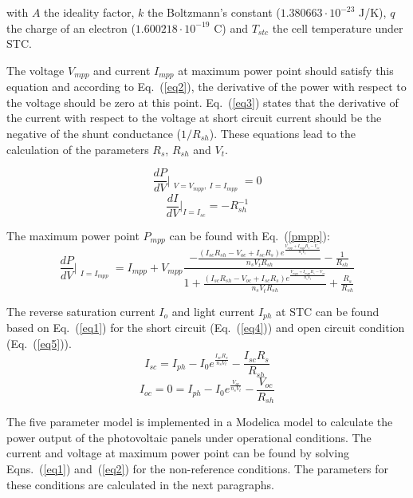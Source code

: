 with $A$ the ideality factor, $k$ the Boltzmann's constant ($1.380663 \cdot 10^{-23}$ J/K), $q$ the charge of an electron ($1.600218 \cdot 10^{-19}$ C) and $T_{stc}$ the cell temperature under STC.

The voltage $V_{mpp}$ and current $I_{mpp}$ at maximum power point should satisfy this equation and according to Eq.~(\ref{eq2}), the derivative of the power with respect to the voltage should be zero at this point. Eq.~(\ref{eq3}) states that the derivative of the current with respect to the voltage at short circuit current should be the negative of the shunt conductance ($1/R_{sh}$). These equations lead to the calculation of the parameters $R_{s}$, $R_{sh}$ and $V_{t}$.

\begin{equation}
\frac{dP}{dV} \Bigr\vert_{\substack{V=V_{mpp},~I=I_{mpp}}} = 0
\label{eq2}
\end{equation}
\begin{equation}
\frac{dI}{dV} \Bigr\vert_{I = I_{sc}} = - R_{sh}^{-1}
\label{eq3}
\end{equation}

The maximum power point $P_{mpp}$ can be found with Eq.~(\ref{pmpp}):
\begin{equation}
\frac{dP}{dV} \Bigr\vert_{\substack{I=I_{mpp}}} = I_{mpp} + V_{mpp} \frac{-\frac{(I_{sc} R_{sh} - V_{oc} + I_{sc} R_{s}) e^{\frac{V_{mpp} + I_{mpp} R_{s} - V_{oc}}{n_{s} V_{t}}}}{n_{s} V_{t} R_{sh}} - \frac{1}{R_{sh}}}{1 + \frac{(I_{sc} R_{sh} - V_{oc} + I_{sc} R_{s}) e^{\frac{V_{mpp} + I_{mpp} R_{s} - V_{oc}}{n_{s} V_{t}}}}{n_{s} V_{t} R_{sh}} + \frac{R_{s}}{R_{sh}}}
\label{pmpp}
\end{equation}

The reverse saturation current $I_{o}$ and light current $I_{ph}$ at STC can be found based on Eq.~(\ref{eq1}) for the short circuit (Eq.~(\ref{eq4})) and open circuit condition (Eq.~(\ref{eq5})).
\begin{equation}
I_{sc} = I_{ph} - I_{0} e^{\frac{I_{sc} R_{s}}{n_{s} V_{t}}} - \frac{I_{sc} R_{s}}{R_{sh}}
\label{eq4}
\end{equation}
\begin{equation}
I_{oc} = 0 = I_{ph} - I_{0} e^{\frac{V_{oc}}{n_{s} V_{t}}} - \frac{V_{oc}}{R_{sh}}
\label{eq5}
\end{equation}

The five parameter model is implemented in a Modelica model to calculate the power output of the photovoltaic panels under operational conditions. The current and voltage at maximum power point can be found by solving Eqns.~(\ref{eq1}) and~(\ref{eq2}) for the non-reference conditions. The parameters for these conditions are calculated in the next paragraphs.

